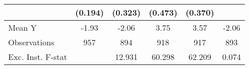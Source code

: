 {\begin{tabular}{l*{5}{c}}
            &     (0.194)         &     (0.323)         &     (0.473)         &     (0.370)         &                     \\
\midrule
Mean Y      &       -1.93         &       -2.06         &        3.75         &        3.57         &       -2.06         \\
Observations&         957         &         894         &         918         &         917         &         893         \\
Exc. Inst. F-stat&                     &      12.931         &      60.298         &      62.209         &       0.074         \\
\bottomrule
\end{tabular}
}
